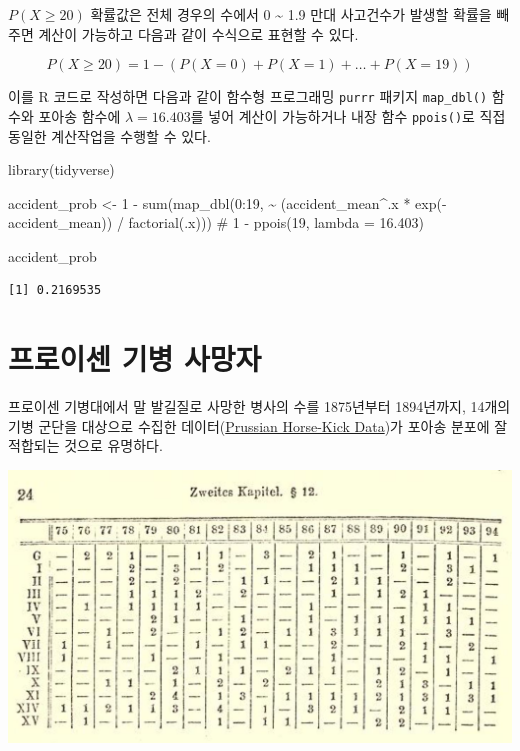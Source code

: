 \documentclass[
  letterpaper,
  chapter,a4paper,showtrims,openright,hidelinks]{oblivoir}
\newenvironment{Shaded}{\begin{snugshade}}{\end{snugshade}}
\newcommand{\CommentTok}[1]{\textcolor[rgb]{0.37,0.37,0.37}{#1}}
\newcommand{\DecValTok}[1]{\textcolor[rgb]{0.68,0.00,0.00}{#1}}
\newcommand{\FunctionTok}[1]{\textcolor[rgb]{0.28,0.35,0.67}{#1}}
\newcommand{\NormalTok}[1]{\textcolor[rgb]{0.00,0.23,0.31}{#1}}
\newcommand{\OtherTok}[1]{\textcolor[rgb]{0.00,0.23,0.31}{#1}}
\newcommand{\SpecialCharTok}[1]{\textcolor[rgb]{0.37,0.37,0.37}{#1}}
\begin{document}
\(P(X \geq 20)\) 확률값은 전체 경우의 수에서 0 \textasciitilde{} 1.9
만대 사고건수가 발생할 확률을 빼주면 계산이 가능하고 다음과 같이
수식으로 표현할 수 있다.

\[
P(X \geq 20) = 1 - (P(X=0) + P(X=1) + \ldots + P(X=19))
\]

이를 R 코드로 작성하면 다음과 같이 함수형 프로그래밍 \texttt{purrr}
패키지 \texttt{map\_dbl()} 함수와 포아송 함수에 \(\lambda = 16.403\)를
넣어 계산이 가능하거나 내장 함수 \texttt{ppois()}로 직접 동일한
계산작업을 수행할 수 있다.

\begin{Shaded}
\begin{Highlighting}[]
\FunctionTok{library}\NormalTok{(tidyverse)}

\NormalTok{accident\_prob }\OtherTok{\textless{}{-}} \DecValTok{1} \SpecialCharTok{{-}} \FunctionTok{sum}\NormalTok{(}\FunctionTok{map\_dbl}\NormalTok{(}\DecValTok{0}\SpecialCharTok{:}\DecValTok{19}\NormalTok{, }\SpecialCharTok{\textasciitilde{}}\NormalTok{ (accident\_mean}\SpecialCharTok{\^{}}\NormalTok{.x }\SpecialCharTok{*} \FunctionTok{exp}\NormalTok{(}\SpecialCharTok{{-}}\NormalTok{accident\_mean)) }\SpecialCharTok{/} \FunctionTok{factorial}\NormalTok{(.x)))}
\CommentTok{\# 1 {-} ppois(19, lambda = 16.403)}

\NormalTok{accident\_prob}
\end{Highlighting}
\end{Shaded}

\begin{verbatim}
[1] 0.2169535
\end{verbatim}

\hypertarget{uxd504uxb85cuxc774uxc13c-uxae30uxbcd1-uxc0acuxb9dduxc790}{%
\section{프로이센 기병
사망자}\label{uxd504uxb85cuxc774uxc13c-uxae30uxbcd1-uxc0acuxb9dduxc790}}

프로이센 기병대에서 말 발길질로 사망한 병사의 수를 1875년부터
1894년까지, 14개의 기병 군단을 대상으로 수집한
데이터(\href{https://www.randomservices.org/random/data/HorseKicks.html}{Prussian
Horse-Kick Data})가 포아송 분포에 잘 적합되는 것으로 유명하다.

\includegraphics{images/horse_kicks.jpg}
\end{document}
